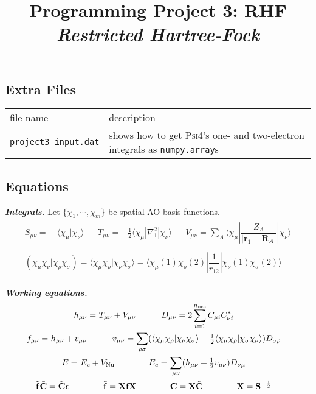 \documentclass[11pt]{article}
\title{Programming Project 3: RHF\\
\textit{Restricted Hartree-Fock}}
\author{}
\date{}
\newcommand{\linl}[1]{\lstinline{#1}{}}
\newcommand{\ev}{\epsilon}   %
\newcommand{\si}{\sigma}     %
\newcommand{\x}{\chi}        %
\newcommand{\tl}{\ensuremath{\tilde}}
\newcommand{\ul}[1]{\underline{#1}}
\renewcommand{\sp}{\hspace{30pt}}
\newcommand{\cd}{\ensuremath{\cdots}}
\newcommand{\bmit}[1]{{\bfseries\itshape\mathversion{bold}#1}}
\newcommand{\bo}[1]{\ensuremath{\mathbf{#1}}}
\newcommand{\fr}[2]{\ensuremath{\dfrac{#1}{#2}}}
\newcommand{\ip}[1]{\ensuremath{\langle#1\rangle}}
\begin{document}
\maketitle
\vspace{-2cm}

\subsection*{Extra Files}
\begin{tabular}{p{}@{}p{}}
  \ul{file name} & \ul{description} \\
  \linl{project3_input.dat}
  & shows how to get \textsc{Psi4}'s one- and two-electron integrals as \linl{numpy.array}s\\
\end{tabular}


\subsection*{Equations}
\bmit{Integrals.}
Let $\{\x_1,\cd,\x_m\}$ be spatial AO basis functions.
\begin{gather}
\begin{aligned}
\label{oei}
  S_{\mu\nu}
=&\
  \ip{\x_{\mu}|\x_{\nu}}
&&
  T_{\mu\nu}
=
  -\tfrac{1}{2}\ip{\x_{\mu}|\nabla_1^2|\x_{\nu}}
&&
  V_{\mu\nu}
=
  \sum_A\ip{\x_{\mu}|\fr{Z_A}{|\bo{r}_1-\bo{R}_A|}|\x_{\nu}}
\end{aligned}\\
\begin{aligned}
\label{tei}
  (\x_\mu\x_\nu|\x_\rho\x_\si)
=
  \ip{\x_\mu\x_\rho|\x_\nu\x_\si}
=
  \ip{\x_\mu(1)\x_\rho(2)|\fr{1}{r_{12}}|\x_\nu(1)\x_\si(2)}
\end{aligned}
\end{gather}

\noindent
\bmit{Working equations.}
\begin{gather}
\begin{aligned}
\label{core-hamiltonian-and-density}
  h_{\mu\nu}
=&\
  T_{\mu\nu}+V_{\mu\nu}
\sp
  D_{\mu\nu}
=
  2
  \sum_{i=1}^{n_\text{occ}}
  C_{\mu i} C_{\nu i}^*
\end{aligned}\\
\begin{aligned}
\label{fock-matrix}
  f_{\mu\nu}
=&\
  h_{\mu\nu}
+
  v_{\mu\nu}
\sp
  v_{\mu\nu}
=
  \sum_{\rho\si}
  (\ip{\x_\mu\x_\rho|\x_\nu\x_\si} - \tfrac{1}{2}\ip{\x_\mu\x_\rho|\x_\si\x_\nu})
  D_{\si\rho}
\end{aligned}\\
\begin{aligned}
\label{energy}
  E
=&\
  E_e
+
  V_\mathrm{Nu}
&&\sp
  E_e
=
  \sum_{\mu\nu}
  (h_{\mu\nu}+\tfrac{1}{2}v_{\mu\nu})D_{\nu\mu}
\end{aligned}\\
\begin{aligned}
\label{orthogonalizer}
&
  \bo{\tl{f}}\bo{\tl{C}}
=
  \bo{\tl{C}}\bm\ev
&&\sp
  \bo{\tl{f}}
=
  \bo{X}\bo{f}\bo{X}
&&\sp
  \bo{C}
=
  \bo{X}
  \bo{\tl{C}}
&&\sp
  \bo{X}
=
  \bo{S}^{-\frac{1}{2}}
\end{aligned}
\end{gather}
\end{document}
